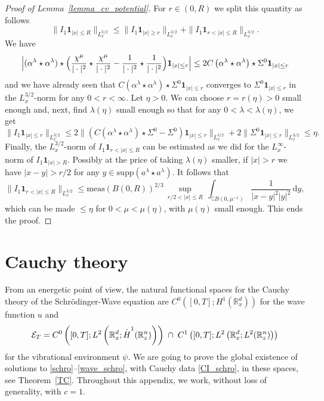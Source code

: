 \documentclass[11pt]{article}
\DeclareRobustCommand{\accentset}[2]{\overset{#1}{#2}}
\theoremstyle{definition}
\newcommand*{\overbigdot}[1]{%
\accentset{\mbox{\large\bfseries .}}{#1}}
\newenvironment{ProofOf}[1]{\begin{proof}[Proof of #1]}{\end{proof}}
\newcommand{\R}{\mathbb{R}}
\newcommand{\ud}{\, {\mathrm{d}}}
\begin{document}
\begin{ProofOf}{Lemma~\ref{lemma_cv_potential}}
For $r\in(0,R)$ we split this quantity as follows
\[
\|I_{1}\mathbf{1}_{|x|\leq R}\|_{L_{x}^{3/2}}\leq\|I_{1}\mathbf{1}_{|x|\geq r}\|_{L_{x}^{3/2}}+\|I_{1}\mathbf{1}_{r<|x|\leq R}\|_{L_{x}^{3/2}}.
\]
We have
\[
\Bigl |(\alpha^{\lambda}\star\alpha^{\lambda})\star \Bigl(\frac{\chi^{\mu}}{|\cdot|^{2}}\star\frac{\chi^{\mu}}{|\cdot|^{2}}-\frac{1}{|\cdot|^{2}}\star\frac{1}{|\cdot|^{2}} \Bigr)\mathbf{1}_{|x|\leq r} \Bigr|\leq 2C\left(\alpha^{\lambda}\star\alpha^{\lambda}\right)\star\Sigma^{0}\mathbf{1}_{|x|\leq r}
\]
and we have already seen that $C(\alpha^{\lambda}\star\alpha^{\lambda})\star\Sigma^{0}\mathbf{1}_{|x|\leq r}$ converges to $\Sigma^{0}\mathbf{1}_{|x|\leq r}$ in the $L_{x}^{3/2}$-norm for any $0<r<\infty$.
Let $\eta>0$. We can choose $r=r(\eta)>0$ small enough and, next, find $\lambda(\eta)$ small enough so that for any $0<\lambda<\lambda(\eta)$, we get
\[
\|I_{1}\mathbf{1}_{|x|\leq r}\|_{L_{x}^{3/2}}\leq 2\|(C(\alpha^{\lambda}\star\alpha^{\lambda})\star\Sigma^{0}-\Sigma^{0})\mathbf{1}_{|x|\leq r}\|_{L_{x}^{3/2}}+2\|\Sigma^{0}\mathbf{1}_{|x|\leq r}\|_{L_{x}^{3/2}}
\leq \eta.
\]
Finally, the $L_{x}^{3/2}$-norm of $I_{1}\mathbf{1}_{r<|x|\leq R}$ can be estimated as we did for the $L_{x}^{\infty}$-norm of $I_{1}\mathbf{1}_{|x|>R}$.
Possibly at the price of taking $\lambda(\eta)$ smaller,
if $|x|>r$ we have $|x-y|>r/2$ for any $y\in \mathrm{supp}(a^\lambda\star a^\lambda)$. It follows that
\[
\|I_{1}\mathbf{1}_{r<|x|\leq R}\|_{L_{x}^{3/2}}\leq\mathrm{meas}\left(B(0,R)\right)^{2/3}\,\underset{r/2<|x|\leq R}{\sup}\,\int_{\complement B(0,\mu^{-1})}\frac{1}{|x-y|^{2}|y|^{2}}\ud y,
\]
which can be made $\leq \eta$ for $0<\mu<\mu(\eta)$, with $\mu(\eta)$ small enough.
This ends the proof.
\end{ProofOf}

\appendix
\section{Cauchy theory}\label{CauchyTheory}

From an energetic point of view, the natural functional spaces for the Cauchy theory of the Schrödinger-Wave equation are $C^{0}([0,T];H^{1}(\R_{x}^{d}))$ for the wave function $u$ and
\[
\mathcal{E}_{T}=C^{0}\left([0,T];L^{2}\left(\R_{x}^{d};\overbigdot{H}^{1}(\R_{z}^{n})\right)\right)\;\cap\;C^{1}\left([0,T];L^{2}\left(\R_{x}^{d};L^{2}(\R_{z}^{n})\right)\right)
\]
for the vibrational environment $\psi$.
We are going to prove the global existence of solutions to \eqref{schro}--\eqref{wave_schro}, with Cauchy data \eqref{CI_schro},
in these spaces, see Theorem~\ref{TC}.
Throughout this appendix, we work, without loss of generality, with $c=1$.
\end{document}

